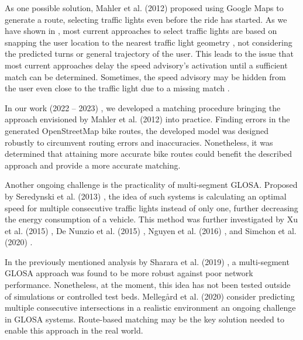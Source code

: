 As one possible solution, Mahler et al. (2012) \cite{mahler_reducing_2012} proposed using Google Maps to generate a route, selecting traffic lights even before the ride has started. As we have shown in , most current approaches to select traffic lights are based on snapping the user location to the nearest traffic light geometry \cite{katsaros_performance_2011, bernais_design_2016, wilson_driver_2017, stahlmann_exploring_2018, bhattacharyya_assessing_2022}, not considering the predicted turns or general trajectory of the user. This leads to the issue that most current approaches delay the speed advisory's activation until a sufficient match can be determined. Sometimes, the speed advisory may be hidden from the user even close to the traffic light due to a missing match \cite{wilson_driver_2017, stahlmann_exploring_2018}.

In our work (2022 -- 2023) \cite{matthes2022matching, matthes2023geo}, we developed a matching procedure bringing the approach envisioned by Mahler et al. (2012) \cite{mahler_reducing_2012} into practice. Finding errors in the generated OpenStreetMap bike routes, the developed model was designed robustly to circumvent routing errors and inaccuracies. Nonetheless, it was determined that attaining more accurate bike routes could benefit the described approach and provide a more accurate matching.

Another ongoing challenge is the practicality of multi-segment GLOSA. Proposed by Seredynski et al. (2013) \cite{seredynski_comparison_2013, seredynski_multi-segment_2013}, the idea of such systems is calculating an optimal speed for multiple consecutive traffic lights instead of only one, further decreasing the energy consumption of a vehicle. This method was further investigated by Xu et al. (2015) \cite{xu_bb_2015}, De Nunzio et al. (2015) \cite{de_nunzio_eco-driving_2015}, Nguyen et al. (2016) \cite{nguyen_efficient_2016}, and Simchon et al. (2020) \cite{simchon_real-time_2020}. 

In the previously mentioned analysis by Sharara et al. (2019) \cite{sharara_impact_2019}, a multi-segment GLOSA approach was found to be more robust against poor network performance. Nonetheless, at the moment, this idea has not been tested outside of simulations or controlled test beds. Mellegård et al. (2020) \cite{mellegard_day_2020} consider predicting multiple consecutive intersections in a realistic environment an ongoing challenge in GLOSA systems. Route-based matching may be the key solution needed to enable this approach in the real world.


